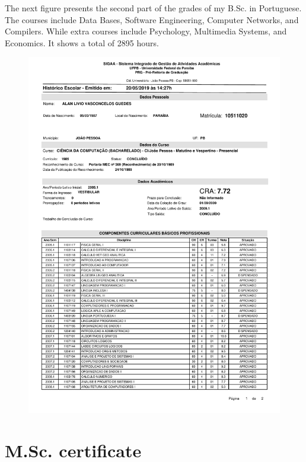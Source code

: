 \documentclass[10pt,a4paper,sans,colorlinks]{moderncv}
\begin{document}
The next figure presents the second part of the grades of my B.Sc. in Portuguese.
The courses include Data Bases, Software Engineering, Computer Networks, and Compilers.
While extra courses include Psychology, Multimedia Systems, and Economics.
It shows a total of 2895 hours.
\vspace{2em}
\begin{figure}
    \centering
    \includegraphics[align=t,width=\textwidth,height=0.6\paperheight, keepaspectratio=true,page=2]{certificates/bsc-grades.pdf}
\end{figure}

\newpage

\section{M.Sc. certificate}
\end{document}
